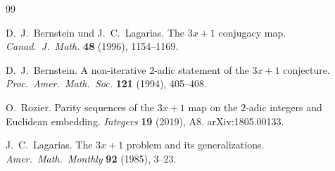 \documentclass[12pt,a4paper]{article}
\begin{document}
\begin{thebibliography}{99}

D.~J.~Bernstein und J.~C.~Lagarias.
The $3x+1$ conjugacy map.
\textit{Canad.\ J.\ Math.} \textbf{48} (1996), 1154--1169.

D.~J.~Bernstein.
A non-iterative $2$-adic statement of the $3x+1$ conjecture.
\textit{Proc.\ Amer.\ Math.\ Soc.} \textbf{121} (1994), 405--408.

O.~Rozier.
Parity sequences of the $3x+1$ map on the $2$-adic integers and Euclidean embedding.
\textit{Integers} \textbf{19} (2019), A8.
arXiv:1805.00133.

J.~C.~Lagarias.
The $3x+1$ problem and its generalizations.
\textit{Amer.\ Math.\ Monthly} \textbf{92} (1985), 3--23.

\end{thebibliography}
\end{document}
